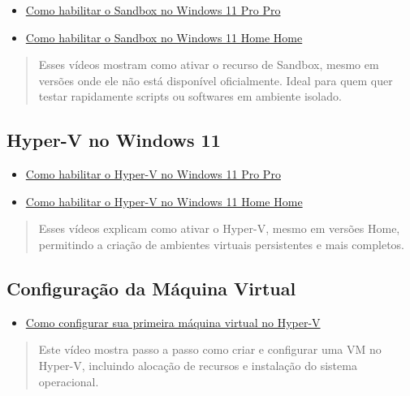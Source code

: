 \documentclass[
  a4paper,
]{book}
\providecommand{\tightlist}{%
  \setlength{\itemsep}{0pt}\setlength{\parskip}{0pt}}\usepackage{longtable,booktabs,array}
\begin{document}
\begin{itemize}
\tightlist
\item
  \href{https://www.youtube.com/watch?v=7BitIt4KbPs}{Como habilitar o
  Sandbox no Windows 11 Pro Pro}
\item
  \href{https://www.youtube.com/watch?v=HHqWrxUy6ps}{Como habilitar o
  Sandbox no Windows 11 Home Home}
\end{itemize}

\begin{quote}
Esses vídeos mostram como ativar o recurso de Sandbox, mesmo em versões
onde ele não está disponível oficialmente. Ideal para quem quer testar
rapidamente scripts ou softwares em ambiente isolado.
\end{quote}

\subsection*{Hyper-V no Windows 11}\label{hyper-v-no-windows-11}

\begin{itemize}
\tightlist
\item
  \href{https://www.youtube.com/watch?v=3bCbjinblhg}{Como habilitar o
  Hyper-V no Windows 11 Pro Pro}
\item
  \href{https://www.youtube.com/watch?v=TmMRFB1U_ns}{Como habilitar o
  Hyper-V no Windows 11 Home Home}
\end{itemize}

\begin{quote}
Esses vídeos explicam como ativar o Hyper-V, mesmo em versões Home,
permitindo a criação de ambientes virtuais persistentes e mais
completos.
\end{quote}

\subsection*{Configuração da Máquina
Virtual}\label{configurauxe7uxe3o-da-muxe1quina-virtual}

\begin{itemize}
\tightlist
\item
  \href{https://www.youtube.com/watch?v=AyYA_-jZsSs}{Como configurar sua
  primeira máquina virtual no Hyper-V}
\end{itemize}

\begin{quote}
Este vídeo mostra passo a passo como criar e configurar uma VM no
Hyper-V, incluindo alocação de recursos e instalação do sistema
operacional.
\end{quote}
\end{document}
